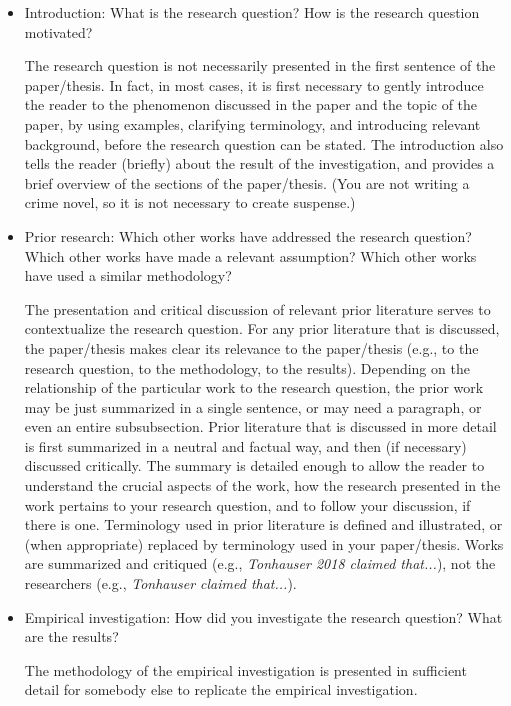 \documentclass[11pt,fleqn,a4paper/thesis]{article}
\newcommand{\6}{\mbox{$[\hspace*{-.6mm}[$}}
\newcommand{\9}{\mbox{$]\hspace*{-.6mm}]$}}
\begin{document}
\begin{itemize}[itemsep=-1pt,leftmargin=2.5ex,topsep=-2pt]
\begin{enumerate}
\begin{itemize}[leftmargin=2.5ex,topsep=-2pt]

\item Introduction: What is the research question? How is the research question motivated?

The research question is not necessarily presented in the first sentence of the paper/thesis. In fact, in most cases, it is first necessary to gently introduce the reader to the phenomenon discussed in the paper and the topic of the paper, by using examples, clarifying terminology, and introducing relevant background, before the research question can be stated. The introduction also tells the reader (briefly) about the result of the investigation, and provides a brief overview of the sections of the paper/thesis. (You are not writing a crime novel, so it is not necessary to create suspense.)

\item Prior research: Which other works have addressed the research question? Which other works have made a relevant assumption? Which other works have used a similar methodology?

The presentation and critical discussion of relevant prior literature serves to contextualize the research question. For any prior literature that is discussed, the paper/thesis makes clear its relevance to the paper/thesis (e.g., to the research question, to the methodology, to the results). Depending on the relationship of the particular work to the research question, the prior work may be just summarized in a single sentence, or may need a paragraph, or even an entire subsubsection. Prior literature that is discussed in more detail is first summarized in a neutral and factual way, and then (if necessary) discussed critically. The summary is detailed enough to allow the reader to understand the crucial aspects of the work, how the research presented in the work pertains to your research question, and to follow your discussion, if there is one. Terminology used in prior literature is defined and illustrated, or (when appropriate) replaced by terminology used in your paper/thesis. Works are summarized and critiqued (e.g., {\em Tonhauser 2018 claimed that...}), not the researchers (e.g., {\em Tonhauser claimed that...}). 

\item Empirical investigation: How did you investigate the research question? What are the results?

The methodology of the empirical investigation is presented in sufficient detail for somebody else to replicate the empirical investigation. 


\end{itemize}
\end{enumerate}
\end{itemize}
\end{document}
